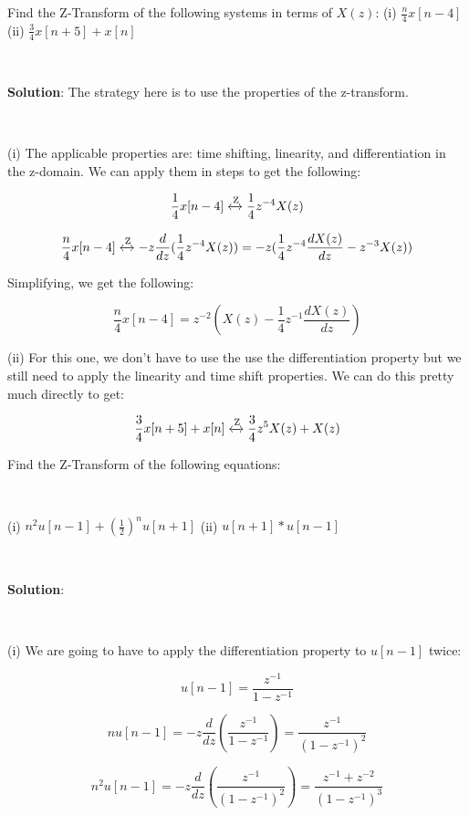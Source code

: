 \documentclass{article}
\begin{document}
Find the Z-Transform of the following systems in terms of $X(z)$:
\newline\newline
(i) $\frac{n}{4} x[n-4] $
\newline\newline
(ii) $\frac{3}{4} x[n+5] + x[n]$

\

\noindent \textbf{Solution}: The strategy here is to use the properties of the z-transform.

\

\noindent (i) The applicable properties are: time shifting, linearity, and differentiation in the z-domain. We can apply them in steps to get the following:

$$\frac{1}{4}x[n-4] \xleftrightarrow{\text{Z}} \frac{1}{4}z^{-4}X(z)$$

$$\frac{n}{4}x[n-4] \xleftrightarrow{\text{Z}} -z \frac{d}{dz} (\frac{1}{4}z^{-4}X(z)) = -z(\frac{1}{4}z^{-4}\frac{d X(z)}{dz} - z^{-3}X(z))$$

\noindent Simplifying, we get the following:

$$\frac{n}{4}x[n-4] = z^{-2}(X(z) - \frac{1}{4}z^{-1}\frac{d X(z)}{dz})$$

\noindent (ii) For this one, we don't have to use the use the differentiation property but we still need to apply the linearity and time shift properties. We can do this pretty much directly to get:

$$\frac{3}{4}x[n+5] + x[n] \xleftrightarrow{\text{Z}} \frac{3}{4}z^{5}X(z) + X(z)$$

\newpage

\noindent Find the Z-Transform of the following equations:

\

\noindent (i) $n^2 u[n-1] + (\frac{1}{2})^n u[n+1]$
\newline\newline
(ii) $u[n+1] * u[n-1]$

\

\noindent \textbf{Solution}:

\

\noindent (i) We are going to have to apply the differentiation property to $u[n-1]$ twice:

$$u[n-1] = \frac{z^{-1}}{1-z^{-1}}$$

$$nu[n-1] = -z \frac{d}{dz}(\frac{z^{-1}}{1-z^{-1}}) = \frac{z^{-1}}{(1-z^{-1})^2}$$

$$n^2u[n-1] = -z \frac{d}{dz}(\frac{z^{-1}}{(1-z^{-1})^2}) = \frac{z^{-1} + z^{-2}}{(1-z^{-1})^3}$$
\end{document}
